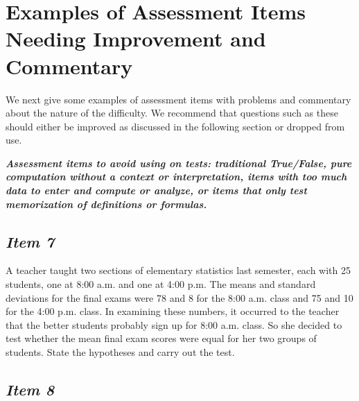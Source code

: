 \section{\textbf{Examples of Assessment Items Needing Improvement and Commentary}}


We next give some examples of assessment items with problems and commentary about the nature of the difficulty. We recommend that questions such as these should either be improved as discussed in the following section or dropped from use.





\vspace{8pt}





\textbf{\textit{Assessment items to avoid using on tests: traditional True/False, pure computation without a context or interpretation, items with too much data to enter and compute or analyze, or items that only test memorization of definitions or formulas.}}





\subsection{\textbf{\textit{Item 7}}}


A teacher taught two sections of elementary statistics last semester, each with 25 students, one at 8:00 a.m. and one at 4:00 p.m. The means and standard deviations for the final exams were 78 and 8 for the 8:00 a.m. class and 75 and 10 for the 4:00 p.m. class. In examining these numbers, it occurred to the teacher that the better students probably sign up for 8:00 a.m. class. So she decided to test whether the mean final exam scores were equal for her two groups of students. State the hypotheses and carry out the test.











\subsection{\textbf{\textit{Item 8}}}


